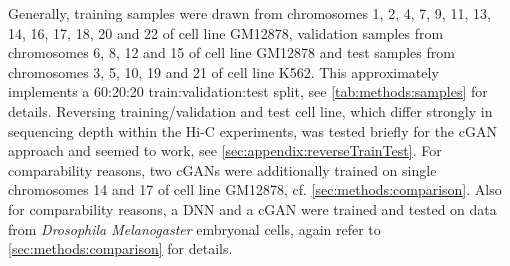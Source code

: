 Generally, training samples were drawn from chromosomes 1, 2, 4, 7, 9, 11, 13, 14, 16, 17, 18, 20 and 22 of cell line GM12878, 
validation samples from chromosomes 6, 8, 12 and 15 of cell line GM12878 and test samples from chromosomes 3, 5, 10, 19 and 21 of cell line K562.
This approximately implements a 60:20:20 train:validation:test split, see \cref{tab:methods:samples} for details.
Reversing training/validation and test cell line, which differ strongly in sequencing depth within the Hi-C experiments, 
was tested briefly for the cGAN approach and seemed to work, see \cref{sec:appendix:reverseTrainTest}.
For comparability reasons, two cGANs were additionally trained on single chromosomes 14 and 17 of cell line GM12878,  cf. \cref{sec:methods:comparison}.
Also for comparability reasons, a DNN and a cGAN were trained and tested on data from \emph{Drosophila Melanogaster} embryonal cells, again refer to \cref{sec:methods:comparison}
for details.


